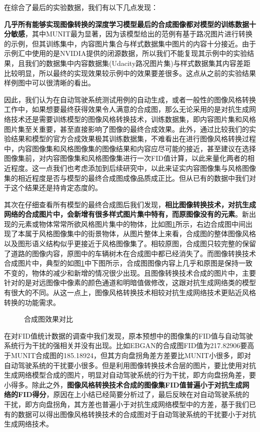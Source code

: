 在综合了最后的实验数据，我们有以下几点发现：

\textbf{几乎所有能够实现图像转换的深度学习模型最后的合成图像都对模型的训练数据十分敏感}，其中MUNIT最为显著，因为该模型给出的范例有基于路况图片进行转换的示例，但其训练集中，内容图片集合与样式数据集中图片的内容十分接近。由于示例汇中使用的是NVIDIA提供的闭源数据，所以我们不能复现其示例中的实验结果，且我们的数据集中内容数据集(Udacity路况图片集)与样式数据集其内容差距比较明显，所以最终的实现效果较示例中的效果要差很多。这点从之前的实验结果样例图中可以很清晰的看出。

因此，我们认为在自动驾驶系统测试用例的自动生成，或者一般性的图像风格转换工作中，如果想要最终获得效果令人满意的合成图，那么无论采用的是对抗生成网络技术还是需要训练模型的图像风格转换技术，训练数据集，即内容图片集和风格图片集至关重要，甚至直接影响了图像的最终合成效果。此外，通过比较我们的实验结果和模型的官方合成效果极其训练数据集，不难看出在进行图像风格转换过程中，内容图像集和风格图像集的图像结果和内容应尽可能的接近，甚至建议在选择图像集前，对内容图像集和风格图像集进行一次FID值计算，以此来量化两者的相近程度。这一点我们也考虑添加到后续研究中，以此来证实内容图像集与风格图像集的相近程度是否与模型的最终合成图成像品质成正比。但从已有的数据中我们对于这个结果还是持肯定态度的。

其次在仔细查看所有模型的最终合成图后我们发现，\textbf{相比图像转换技术，对抗生成网络的合成图片中，会新增有很多样式图片集中特有，而原图像没有的元素}。新出现的元素或物体常常所欲风格图片集中的物体，比如图\ref{fig:new}所示，右边合成图中间出现了本属于风格图像集中的街景物体，从图片整体上来看，合成图的整体图像风格以及图形语义结构似乎更接近于风格图像集了。相较原图，合成图只较完整的保留了道路的图像内容，原图中的车辆树木在合成图中都已经消失了。而图像转换技术合成图片中，典型的如图\ref{fig:new}中下图所示，合成图图像内容上几乎和原图是保持一致不变的，物体的减少和新增的情况很少出现。且图像转换技术合成的图片中，主要针对的是对远图像中像素的颜色通道和明暗值做修改，这跟对抗生成网络类的模型有很大的不同。从这一点上，图像风格转换技术相较对抗生成网络技术更贴近风格转换的功能需求。

\begin{figure}[h]
    \centering
    \caption{合成图效果对比}
    \label{fig:new}
\end{figure}

在对FID值统计数据的调查中我们发现，原本预想中的图像集的FID值与自动驾驶系统行为干扰的强相关并没有出现。比如EBGAN的合成图FID值为217.82906要高于MUNIT合成图的185.18924，但其方向盘拐角差方差要比MUNIT小很多，即对自动驾驶系统的干扰要小很多。但是利用图像转换技术合层的图片，要比使用对抗生成网络模型合成的图片，明显对自动驾驶系统的行为干扰，即方向盘拐角差，要小得多。除此之外，\textbf{图像风格转换技术合成的图像集FID值普遍小于对抗生成网络的FID得分}，原因在上小结已经简要分析过了，最后反映在对自动驾驶系统的干扰，即方向盘拐角，其方差也普遍小于对抗生成网络模型中的方差，基于我们已有的数据可以得出图像风格转换技术的合成图对于自动驾驶系统的干扰要小于对抗生成网络技术。

